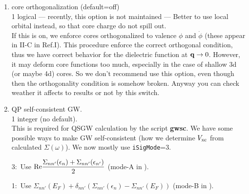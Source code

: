 \documentclass[a4paper,10pt,epsf,fleqn]{article}
\newcommand{\keyw}[1]{\fbox{\tt #1}}
\newcommand{\ds}{\displaystyle}
\newcommand{\exe}[1]{{\bf #1}}
\begin{document}
{\begin{enumerate}


\item core orthogonalization (default=off)\\
\keyw{CoreOrth} 1 logical --- recently, this option is not maintained
--- Better to use local orbital instead, so that core charge do not spill out.\\
If this is on, we enforce cores orthogonalized to valence 
$\phi$ and $\dot{\phi}$ (these appear in II-C in Ref.I).
This procedure enforce the correct orthogonal condition, thus
we have correct behavior for the dielectric function at ${\bf q} \to 0$.
However, it may deform core functions too much, 
especially in the case of shallow 3d (or maybe 4d) cores.
So we don't recommend use this option, even though then 
the orthogonality condition is somehow broken.
Anyway you can check weather it affects to results or not by this switch.

\item QP self-consistent GW.\\
\keyw{iSigMode} 1 integer (no default).\\
This is required for QSGW calculation by the script \exe{gwsc}.
We have some possible ways to make GW self-consistent
(how we determine $V_{\rm xc}$ from calculated $\Sigma(\omega)$).
We now mostly use {\tt iSigMode}=3. 

3:\ Use $\ds {\rm Re}\frac{\Sigma_{nn'}(\epsilon_n)+\Sigma_{nn'}(\epsilon_{n'})}{2}$
  (mode-A in \cite{xxx}).

1:\ Use $\ds \Sigma_{nn'}(E_F) + \delta_{nn'}(\Sigma_{nn'}(\epsilon_n)-\Sigma_{nn'}(E_F))$
   (mode-B in \cite{xxx}).


\end{enumerate}}
\end{document}
